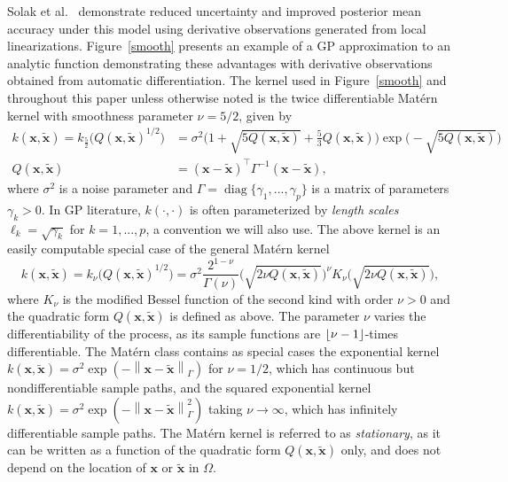 \documentclass{article}
\newcommand{\norm}[1]{\left\lVert#1\right\rVert}
\renewcommand{\vec}[1]{\mathbf{#1}}
\DeclareMathOperator{\diag}{diag}
\DeclarePairedDelimiter\floor{\lfloor}{\rfloor}
\numberwithin{equation}{section}
\begin{document}
Solak et al.~\cite{solak2003derivative} demonstrate reduced uncertainty and improved posterior mean accuracy under this model using derivative observations generated from local linearizations. Figure~\ref{smooth} presents an example of a GP approximation to an analytic function demonstrating these advantages with derivative observations obtained from automatic differentiation. The kernel used in Figure~\ref{smooth} and throughout this paper unless otherwise noted is the twice differentiable Mat\'ern kernel with smoothness parameter $\nu = 5/2$, given by
\begin{align*}
  k(\vec{x}, \tilde{\vec{x}}) = k_{\frac{5}{2}}\Big(Q(\vec{x}, \tilde{\vec{x}})^{1/2}\Big) & = \sigma^2 \Big(1 + \sqrt{5Q(\vec{x}, \tilde{\vec{x}})} + \frac{5}{3}Q(\vec{x}, \tilde{\vec{x}}) \Big) \exp\Big( - \sqrt{5Q(\vec{x}, \tilde{\vec{x}})} \Big) \\
  Q(\vec{x}, \tilde{\vec{x}}) & = (\vec{x} - \tilde{\vec{x}})^\top \Gamma^{-1} (\vec{x} - \tilde{\vec{x}}),
\end{align*}
where $\sigma^2$ is a noise parameter and $\Gamma = \diag\{\gamma_1,...,\gamma_p\}$ is a matrix of parameters $\gamma_k > 0$. In GP literature, $k(\cdot, \cdot)$ is often parameterized by \textit{length scales} $\ell_k = \sqrt{\gamma_k}$ for $k=1,...,p$, a convention we will also use.
The above kernel is an easily computable special case of the general Mat\'ern kernel
$$ k(\vec{x}, \tilde{\vec{x}}) = k_\nu \Big(Q(\vec{x}, \tilde{\vec{x}})^{1/2}\Big) = \sigma^2 \frac{2^{1-\nu}}{\Gamma(\nu)} \Big(\sqrt{2\nu Q(\vec{x}, \tilde{\vec{x}})}\Big)^\nu K_\nu\Big(\sqrt{2\nu Q(\vec{x}, \tilde{\vec{x}})}\Big), $$
where $K_\nu$ is the modified Bessel function of the second kind with order $\nu > 0$ and the quadratic form $Q(\vec{x}, \tilde{\vec{x}})$ is defined as above. The parameter $\nu$ varies the differentiability of the process, as its sample functions are $\floor{\nu-1}$-times differentiable. The Mat\'ern class contains as special cases the exponential kernel
$k(\vec{x}, \tilde{\vec{x}}) = \sigma^2 \exp(-\norm{\vec{x} - \tilde{\vec{x}}}_\Gamma)$ for $\nu = 1/2$, which has continuous but nondifferentiable sample paths, and the squared exponential kernel $k(\vec{x}, \tilde{\vec{x}}) = \sigma^2 \exp(-\norm{\vec{x} - \tilde{\vec{x}}}_\Gamma^2)$
taking $\nu \to \infty$, which has infinitely differentiable sample paths. The Mat\'ern kernel is referred to as \textit{stationary}, as it can be written as a function of the quadratic form $Q(\vec{x}, \tilde{\vec{x}})$ only, and does not depend on the location of $\vec{x}$ or $\tilde{\vec{x}}$ in $\Omega$.
\end{document}
